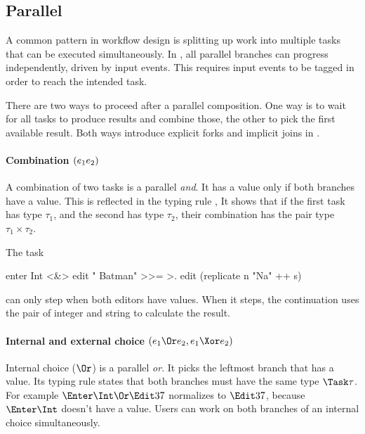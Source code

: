 \subsection{Parallel}

A common pattern in workflow design is splitting up work into multiple tasks that can be executed simultaneously.
In \TOPHAT, all parallel branches can progress independently, driven by input events.
This requires input events to be tagged in order to reach the intended task.

There are two ways to proceed after a parallel composition.
One way is to wait for all tasks to produce results and combine those,
the other to pick the first available result.
Both ways introduce explicit forks and implicit joins in \TOPHAT.


\paragraph{Combination $(e_1 \relax e_2)$}

A combination of two tasks is a parallel \emph{and}.
It has a value only if both branches have a value.
This is reflected in the typing rule ,
It shows that if the first task has type $\tau_1$,
and the second has type $\tau_2$,
their combination has the pair type $\tau_1 \times \tau_2$.



\begin{example}[Combining]

The task
\begin{TASK}
  enter Int <&> edit " Batman" >>= >. edit (replicate n "Na" ++ s)
\end{TASK}
can only step when both editors have values.
When it steps, the continuation uses the pair of integer and string to calculate the result.

\end{example}


\paragraph{Internal and external choice $(e_1 \Or e_2, e_1 \Xor e_2)$}

Internal choice ($\Or$) is a parallel \emph{or}.
It picks the leftmost branch that has a value.
Its typing rule  states that both branches must have the same type $\Task \tau$.
For example $\Enter \Int \Or \Edit 37$ normalizes to $\Edit 37$, because $\Enter \Int$ doesn't have a value.
Users can work on both branches of an internal choice simultaneously.

